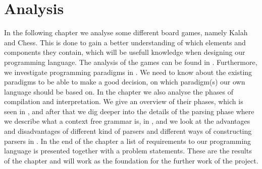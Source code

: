 \chapter{Analysis}
\label{chap:analysis}
In the following chapter we analyse some different board games, namely Kalah and Chess. This is done to gain a better understanding of which elements and components they contain, which will be usefull knowledge when designing our programming language. The analysis of the games can be found in . Furthermore, we investigate programming paradigms in . We need to know about the existing paradigms to be able to make a good decision, on which paradigm(s) our own language should be based on. In the chapter we also analyse the phases of compilation and interpretation. We give an overview of their phases, which is seen in , and after that we dig deeper into the details of the parsing phase where we describe what a context free grammar is, in , and we look at the advantages and disadvantages of different kind of parsers and different ways of constructing parsers in . In the end of the chapter a list of requirements to our programming language is presented together with a problem statements. These are the results of the chapter and will work as the foundation for the further work of the project.









%

